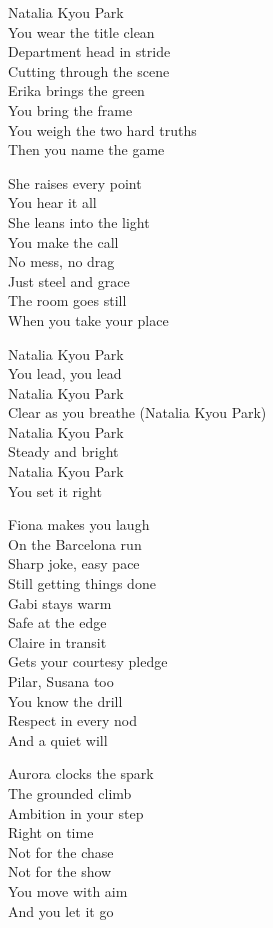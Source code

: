 \begin{lyrics}
Natalia Kyou Park\\
You wear the title clean\\
Department head in stride\\
Cutting through the scene\\
Erika brings the green\\
You bring the frame\\
You weigh the two hard truths\\
Then you name the game

She raises every point\\
You hear it all\\
She leans into the light\\
You make the call\\
No mess, no drag\\
Just steel and grace\\
The room goes still\\
When you take your place

Natalia Kyou Park\\
You lead, you lead\\
Natalia Kyou Park\\
Clear as you breathe (Natalia Kyou Park)\\
Natalia Kyou Park\\
Steady and bright\\
Natalia Kyou Park\\
You set it right

Fiona makes you laugh\\
On the Barcelona run\\
Sharp joke, easy pace\\
Still getting things done\\
Gabi stays warm\\
Safe at the edge\\
Claire in transit\\
Gets your courtesy pledge\\
Pilar, Susana too\\
You know the drill\\
Respect in every nod\\
And a quiet will

Aurora clocks the spark\\
The grounded climb\\
Ambition in your step\\
Right on time\\
Not for the chase\\
Not for the show\\
You move with aim\\
And you let it go


\end{lyrics}
